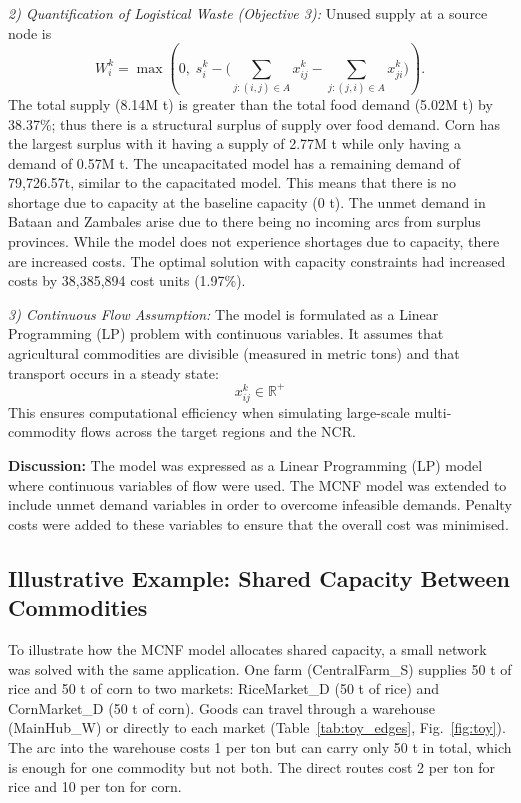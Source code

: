 \documentclass{icsthesis}
\begin{document}
\begin{mainmatter}
\textit{2) Quantification of Logistical Waste (Objective 3):} Unused supply at a source node is
\[
W_i^k = \max\left(0,\; s_i^k - \Big(\sum_{j:(i,j)\in A} x_{ij}^k - \sum_{j:(j,i)\in A} x_{ji}^k\Big)\right).
\]
The total supply (8.14M t) is greater than the total food demand (5.02M t) by 38.37\%; thus there is a structural surplus of supply over food demand. Corn has the largest surplus with it having a supply of 2.77M t while only having a demand of 0.57M t. The uncapacitated model has a remaining demand of 79,726.57t, similar to the capacitated model. This means that there is no shortage due to capacity at the baseline capacity (0 t). The unmet demand in Bataan and Zambales arise due to there being no incoming arcs from surplus provinces. While the model does not experience shortages due to capacity, there are increased costs. The optimal solution with capacity constraints had increased costs by 38,385,894 cost units (1.97\%).

\textit{3) Continuous Flow Assumption:} The model is formulated as a Linear Programming (LP) problem with continuous variables. It assumes that agricultural commodities are divisible (measured in metric tons) and that transport occurs in a steady state:$$x_{ij}^k \in \mathbb{R}^+$$This ensures computational efficiency when simulating large-scale multi-commodity flows across the target regions and the NCR.

\textbf{Discussion:}  
The model was expressed as a Linear Programming (LP) model where continuous variables of flow were used. The MCNF model was extended to include unmet demand variables in order to overcome infeasible demands. Penalty costs were added to these variables to ensure that the overall cost was minimised.

\subsection{Illustrative Example: Shared Capacity Between Commodities}
To illustrate how the MCNF model allocates shared capacity, a small network was solved with the same application. One farm (CentralFarm\_S) supplies 50 t of rice and 50 t of corn to two markets: RiceMarket\_D (50 t of rice) and CornMarket\_D (50 t of corn). Goods can travel through a warehouse (MainHub\_W) or directly to each market (Table~\ref{tab:toy_edges}, Fig.~\ref{fig:toy}). The arc into the warehouse costs 1 per ton but can carry only 50 t in total, which is enough for one commodity but not both. The direct routes cost 2 per ton for rice and 10 per ton for corn.


\end{mainmatter}
\end{document}
